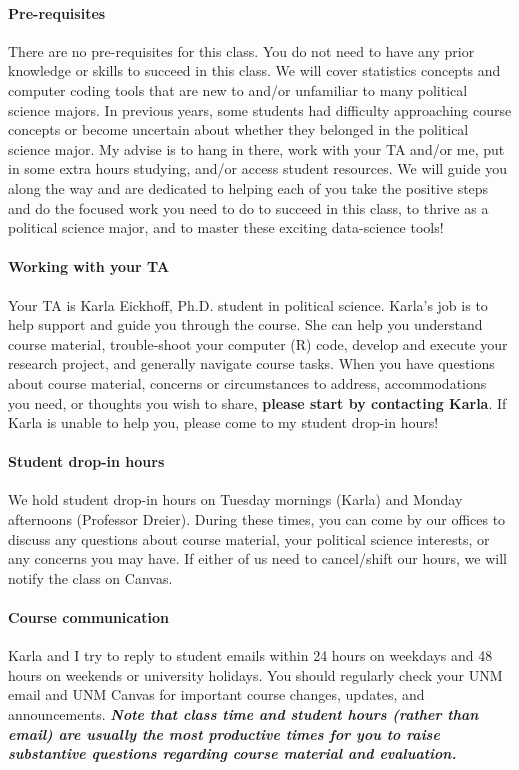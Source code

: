 \documentclass[11pt]{article}
\begin{document}
\paragraph{Pre-requisites} There are no pre-requisites for this class. You do not need to have any prior knowledge or skills to succeed in this class. We will cover statistics concepts and computer coding tools that are new to and/or unfamiliar to many political science majors. In previous years, some students had difficulty approaching course concepts or become uncertain about whether they belonged in the political science major. My advise is to hang in there, work with your TA and/or me, put in some extra hours studying, and/or access student resources. We will guide you along the way and are dedicated to helping each of you take the positive steps and do the focused work you need to do to succeed in this class, to thrive as a political science major, and to master these exciting data-science tools! 

\paragraph{Working with your TA} Your TA is Karla Eickhoff, Ph.D. student in political science. Karla's job is to help support and guide you through the course. She can help you understand course material, trouble-shoot your computer (R) code, develop and execute your research project, and generally navigate course tasks. When you have questions about course material, concerns or circumstances to address, accommodations you need, or thoughts you wish to share, \textbf{please start by contacting Karla}. If Karla is unable to help you, please come to my student drop-in hours!

\paragraph{Student drop-in hours} We hold student drop-in hours on Tuesday mornings (Karla) and Monday afternoons (Professor Dreier). During these times, you can come by our offices to discuss any questions about course material, your political science interests, or any concerns you may have. If either of us need to cancel/shift our hours, we will notify the class on Canvas. 

\paragraph{Course communication} Karla and I try to reply to student emails within 24 hours on weekdays and 48 hours on weekends or university holidays. %
You should regularly check your UNM email and UNM Canvas for important course changes, updates, and announcements. \textbf{\textit{Note that class time and student hours (rather than email) are usually the most productive times for you to raise substantive questions regarding course material and evaluation.}}
\end{document}
